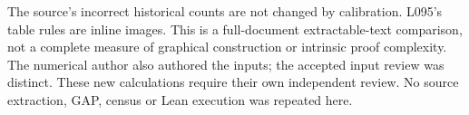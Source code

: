 \documentclass[a4paper,11pt]{article}
\begin{document}
The source’s incorrect historical counts are not changed by calibration.
L095’s table rules are inline images. This is a full-document extractable-text
comparison, not a complete measure of graphical construction or intrinsic proof
complexity. The numerical author also authored the inputs; the accepted input
review was distinct. These new calculations require their own independent
review. No source extraction, GAP, census or Lean execution was repeated here.
\end{document}
